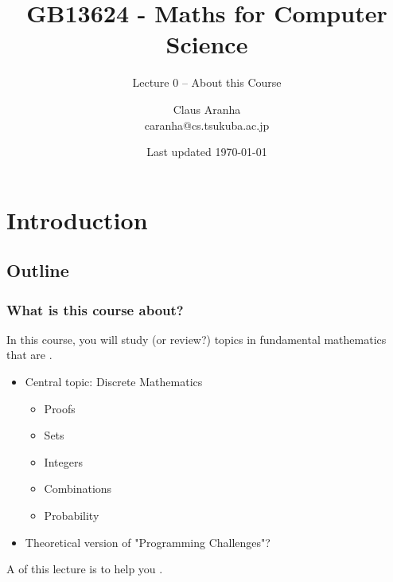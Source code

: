 \documentclass[aspectratio=169]{beamer}
\title[GB13624]{GB13624 - Maths for Computer Science}
\subtitle[]{Lecture 0 -- About this Course}
\author[Claus Aranha]{Claus Aranha\\{\footnotesize caranha@cs.tsukuba.ac.jp}}
\institute[COINS]{College of Information Science}
\date[]{{\tiny Last updated \today}}
\begin{document}
\section{Introduction}
\subsection{Outline}

\begin{frame}
  \maketitle
\end{frame}

\begin{frame}
  \frametitle{What is this course about?}

  In this course, you will study (or review?) topics in fundamental mathematics that are .

  \vfill

  \begin{itemize}
  \item Central topic: Discrete Mathematics
    \begin{itemize}
    \item Proofs
    \item Sets
    \item Integers
    \item Combinations
    \item Probability
    \end{itemize}
  \bigskip

  \item Theoretical version of "Programming Challenges"?
  \end{itemize}


  \bigskip

  A  of this lecture is to help you .
\end{frame}
\end{document}
